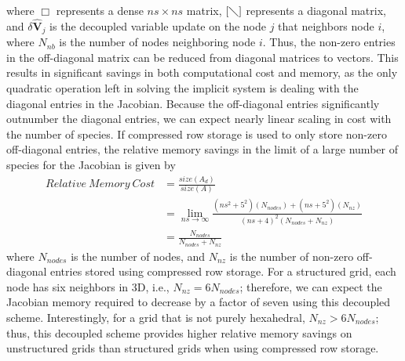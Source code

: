 where $\Box$ represents a dense $ns \times ns$ matrix, $[\diagdown]$ represents
a diagonal matrix, and $\delta \mathbf{\hat{V}}_j$  is the decoupled variable
update on the node $j$ that neighbors node $i$, where $N_{nb}$ is the number of
nodes neighboring node $i$.  Thus, the non-zero entries in the off-diagonal
matrix can be reduced from diagonal matrices to vectors.  This results in
significant savings in both computational cost and memory, as the only quadratic
operation left in solving the implicit system is dealing with the diagonal
entries in the Jacobian.  Because the off-diagonal entries significantly
outnumber the diagonal entries, we can expect nearly linear scaling in cost with
the number of species.  If compressed row storage\cite{George} is used to
only store non-zero off-diagonal entries, the relative memory savings in the
limit of a large number of species for the Jacobian is given by
\begin{equation}
  \label{mem_req_eq}
  \begin{split} 
    Relative\ Memory\ Cost &=
    \frac{size(A_d)}{size(A)} \\ &= \lim_{ns\to\infty}
    \frac{(ns^2+5^2)(N_{nodes})+(ns+5^2)(N_{nz})}{(ns+4)^2(N_{nodes}+N_{nz})} \\
    &= \frac{N_{nodes}}{N_{nodes} + N_{nz}}
  \end{split}
\end{equation}
where $N_{nodes}$ is the number of nodes, and $N_{nz}$ is the number of non-zero
off-diagonal entries stored using compressed row storage. For a structured grid,
each node has six neighbors in 3D, i.e., $N_{nz} = 6N_{nodes}$; therefore, we can
expect the Jacobian memory required to decrease by a factor of seven using this
decoupled scheme. Interestingly, for a grid that is not purely hexahedral,
$N_{nz} > 6N_{nodes}$; thus, this decoupled scheme provides higher relative
memory savings on unstructured grids than structured grids when using compressed
row storage.

